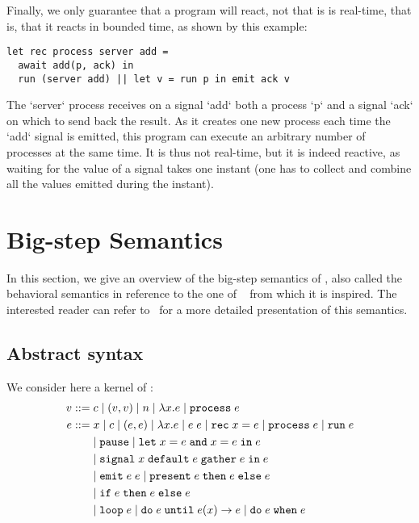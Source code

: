\documentclass[9pt,preprint]{sigplanconf}
\newcommand{\sdeq}{::=}
\begin{document}
Finally, we only guarantee that a program will react, not that is is real-time, that is, that it reacts in bounded time, as shown by this example:
\begin{lstlisting}
let rec process server add =
  await add(p, ack) in
  run (server add) || let v = run p in emit ack v
\end{lstlisting}
%
The `server` process receives on a signal `add` both a process `p` and a signal `ack` on which to send back the result. As it creates one new process each time the `add` signal is emitted, this program can execute an arbitrary number of processes at the same time. It is thus not real-time, but it is indeed reactive, as waiting for the value of a signal takes one instant (one has to collect and combine all the values emitted during the instant).

\section{Big-step Semantics}
\label{sec:semantics}

In this section, we give an overview of the big-step semantics of \rml{}, also called the behavioral semantics in reference to the one of \esterel~\cite{Berry:1997} from which it is inspired. The interested reader can refer to~\cite{Mandel:2005} for a more detailed presentation of this semantics.

\subsection{Abstract syntax}

We consider here a kernel of \rml{}:
%
\begin{align*}
v \sdeq &\; c \mid (v, v) \mid n \mid \elam{x}{e} \mid \eproc{e} \\
e \sdeq &\;  x \mid c \mid (e, e) \mid \elam{x}{e} 
  \mid \eapp{e}{e} \mid \erec{x}{e}  \mid \eproc{e} \mid \erun{e} \\
 & \mid \epause{} \mid \eletpar{x}{e}{x}{e}{e} \\
 &\mid \esig{x}{e}{e}{e} \\
 & \mid \eemit{e}{e} \mid \epres{e}{e}{e} \\
 & \mid \eite{e}{e}{e} \\
 &  \mid \eloop{e} \mid \euntil{e}{e}{x}{e} 
   \mid \ewhen{e}{e} 
\end{align*}
\end{document}
